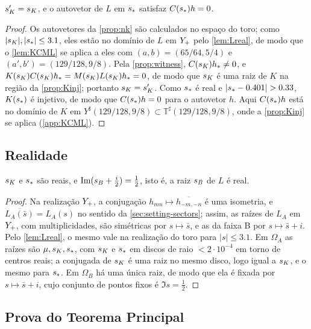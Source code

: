 \begin{corollary}\label{cor:sK}
$s_{K}'=s_{K}$, e o autovetor de $L$ em $s_{\ast}$ satisfaz $C(s_{\ast})h=0$.
\end{corollary}

\begin{proof}
Os autovetores da \cref{prop:nk} são calculados no espaço do toro; como $|s_{K}|,|s_{\ast}|\le3.1$, eles estão no
domínio de $L$ em $Y_{+}$ pelo \cref{lem:Lreal}, de modo que o \cref{lem:KCML} se aplica a eles com $(a,b)=(65/64,5/4)$ e
$(a',b')=(129/128,9/8)$. Pela \cref{prop:witness}, $C(s_{K})h_*\neq0$, e $K(s_{K})C(s_{K})h_*=M(s_{K})L(s_{K})h_*=0$, de modo que $s_{K}$ é
uma raiz de $K$ na região da \cref{prop:Kinj}; portanto $s_{K}=s_{K}'$. Como $s_{\ast}$ é real e $|\sphys-0.401|>0.33$,
$K(s_{\ast})$ é injetivo, de modo que $C(s_{\ast})h=0$ para o autovetor $h$. Aqui $C(s_{\ast})h$ está no domínio de $K$ em $Y^\sharp(129/128,9/8)\subset\mathbb T^\sharp(129/128,9/8)$, onde
a \cref{prop:Kinj} se aplica (\cref{app:KCML}).
\end{proof}

\subsection{Realidade}\label{sec:roots-reality}

\begin{proposition}\label{prop:real}
$s_{K}$ e $s_{\ast}$ são reais, e $\operatorname{Im}(s_{B}+\tfrac i2)=\tfrac12$, isto é, a raiz $s_{B}$ de $L$ é real.
\end{proposition}

\begin{proof}
Na realização $Y_{+}$, a conjugação $h_{mn}\mapsto\overline{h_{-m,-n}}$ é uma isometria, e
$\overline{L_A(\bar s)}=L_A(s)$ no sentido da \cref{sec:setting-sectors}; assim, as raízes de $L_A$ em $Y_{+}$, com
multiplicidades, são simétricas por $s\mapsto\bar s$, e as da faixa B por $s\mapsto\bar s+i$. Pelo
\cref{lem:Lreal}, o mesmo vale na realização do toro para $|s|\le3.1$. Em $\Omega_A$ as raízes são $\mu,s_{K},s_{\ast}$,
com $s_{K}$ e $s_{\ast}$ em discos de raio $<2\cdot10^{-4}$ em torno de centros reais; a conjugada de $s_{K}$ é uma raiz no
mesmo disco, logo igual a $s_{K}$, e o mesmo para $s_{\ast}$. Em $\Omega_B$ há uma única raiz, de modo que ela é fixada por
$s\mapsto\bar s+i$, cujo conjunto de pontos fixos é $\Im s=\tfrac12$.
\end{proof}

\subsection{Prova do Teorema Principal}\label{sec:roots-proof}

